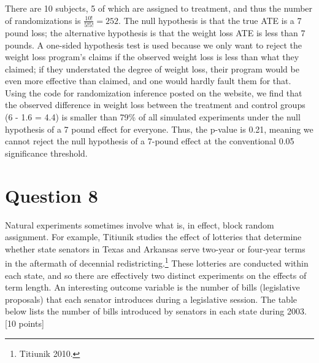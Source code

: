 \documentclass[11pt,notitlepage]{article}\usepackage[]{graphicx}\usepackage[]{color}
\begin{document}
There are 10 subjects, 5 of which are assigned to treatment, and thus the number of randomizations is $\frac{10!}{5!5!}=252$.  The null hypothesis is that the true ATE is a 7 pound loss; the alternative hypothesis is that the weight loss ATE is less than 7 pounds.  A one-sided hypothesis test is used because we only want to reject the weight loss program's claims if the observed weight loss is less than what they claimed; if they understated the degree of weight loss, their program would be even more effective than claimed, and one would hardly fault them for that.  Using the code for randomization inference posted on the website, we find that the observed difference in weight loss between the treatment and control groups (6 - 1.6 = 4.4) is smaller than 79\% of all simulated experiments under the null hypothesis of a 7 pound effect for everyone.  Thus, the p-value is 0.21, meaning we cannot reject the null hypothesis of a 7-pound effect at the conventional 0.05 significance threshold.

\section{Question 8}


Natural experiments sometimes involve what is, in effect, block random assignment. For example, Titiunik studies the effect of lotteries that determine whether state senators in Texas and Arkansas serve two-year or four-year terms in the aftermath of decennial redistricting.\footnote{Titiunik 2010.} These lotteries are conducted within each state, and so there are effectively two distinct experiments on the effects of term length. An interesting outcome variable is the number of bills (legislative proposals) that each senator introduces during a legislative session. The table below lists the number of bills introduced by senators in each state during 2003. [10 points]
\end{document}
